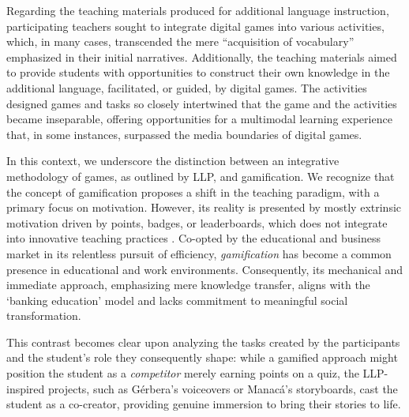 \documentclass[english]{textolivre}
\begin{document}
Regarding the teaching materials produced for additional language instruction, participating teachers sought to integrate digital games into various activities, which, in many cases, transcended the mere “acquisition of vocabulary” emphasized in their initial narratives. Additionally, the teaching materials aimed to provide students with opportunities to construct their own knowledge in the additional language, facilitated, or guided, by digital games. The activities designed games and tasks so closely intertwined that the game and the activities became inseparable, offering opportunities for a multimodal learning experience that, in some instances, surpassed the media boundaries of digital games.

In this context, we underscore the distinction between an integrative methodology of games, as outlined by LLP, and gamification. We recognize that the concept of gamification proposes a shift in the teaching paradigm, with a primary focus on motivation. However, its reality is presented by mostly extrinsic motivation driven by points, badges, or leaderboards, which does not integrate into innovative teaching practices \cite{leffa2020gamificacao,braga2020games}. Co-opted by the educational and business market in its relentless pursuit of efficiency, \textit{gamification} has become a common presence in educational and work environments. Consequently, its mechanical and immediate approach, emphasizing mere knowledge transfer, aligns with the ‘banking education’ model \cite{freire2013oprimido} and lacks commitment to meaningful social transformation.

This contrast becomes clear upon analyzing the tasks created by the participants and the student’s role they consequently shape: while a gamified approach might position the student as a \textit{competitor} merely earning points on a quiz, the LLP-inspired projects, such as Gérbera’s voiceovers or Manacá’s storyboards, cast the student as a co-creator, providing genuine immersion to bring their stories to life.
\end{document}
